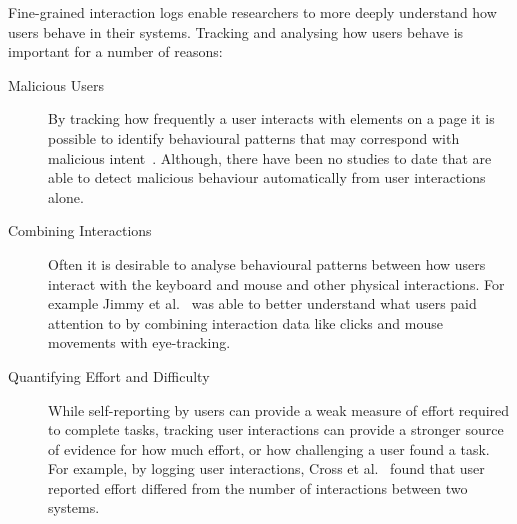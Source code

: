 
Fine-grained interaction logs enable researchers to more deeply understand how users behave in their systems. Tracking and analysing how users behave is important for a number of reasons:

\begin{description}
	\item[Malicious Users] By tracking how frequently a user interacts with elements on a page it is possible to identify behavioural patterns that may correspond with malicious intent~\cite{gadiraju2015understanding}. Although, there have been no studies to date that are able to detect malicious behaviour automatically from user interactions alone.
	\item[Combining Interactions] Often it is desirable to analyse behavioural patterns between how users interact with the keyboard and mouse and other physical interactions. For example Jimmy et al.~\cite{jimmy2020health} was able to better understand what users paid attention to by combining interaction data like clicks and mouse movements with eye-tracking.
	\item[Quantifying Effort and Difficulty] While self-reporting by users can provide a weak measure of effort required to complete tasks, tracking user interactions can provide a stronger source of evidence for how much effort, or how challenging a user found a task. For example, by logging user interactions, Cross et al.~\cite{cross2021search} found that user reported effort differed from the number of interactions between two systems.
\end{description}